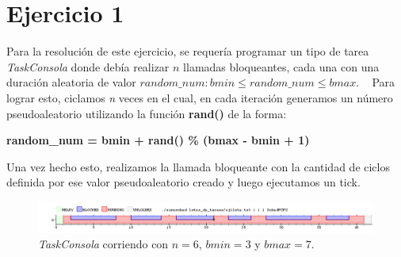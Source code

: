 \section{Ejercicio 1}

Para la resolución de este ejercicio, se requería programar un tipo de tarea \emph{TaskConsola} donde debía realizar $n$ llamadas bloqueantes, cada una con una duración aleatoria de valor $random\_num: bmin \leq random\_ num \leq bmax$.
~
Para lograr esto, ciclamos \emph{n} veces en el cual, en cada iteración generamos un número pseudoaleatorio utilizando la función \textbf{rand()} de la forma:

\begin{center}
	\textbf{random\_num = bmin + rand() \% (bmax - bmin + 1)}
\end{center}

Una vez hecho esto, realizamos la llamada bloqueante con la cantidad de ciclos definida por ese valor pseudoaleatorio creado y luego ejecutamos un tick.

\begin{figure}[!h]
	\begin{center}
		\includegraphics[width=500px]{imagenes/ej1.png}
		\caption{\emph{TaskConsola} corriendo con $n = 6$, $bmin = 3$ y $bmax = 7$.}
	\end{center}
\end{figure}
